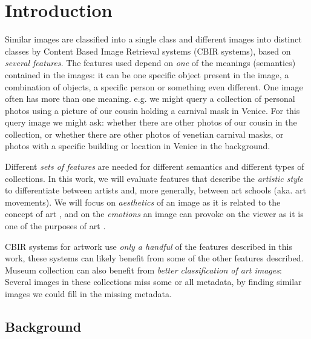 \documentclass[11pt,a4paper,twoside,openright]{report}
\begin{document}
\newpage
\null
\thispagestyle{empty}
\newpage

\newpage
\setcounter{page}{1}

\chapter{Introduction}

Similar images are classified into a single class and different images into
distinct classes by Content Based Image Retrieval systems (CBIR systems), based
on \emph{several features}.  The features used depend on \emph{one} of the
meanings (semantics) contained in the images: it can be one specific object
present in the image, a combination of objects, a specific person or something
even different.  One image often has more than one meaning.  e.g. we might
query a collection of personal photos using a picture of our cousin holding a
carnival mask in Venice.  For this query image we might ask: whether there are
other photos of our cousin in the collection, or whether there are other photos
of venetian carnival masks, or photos with a specific building or location in
Venice in the background.

Different \emph{sets of features} are needed for different semantics and
different types of collections.  In this work, we will evaluate features that
describe the \emph{artistic style} to differentiate between artists and, more
generally, between art schools (aka. art movements).  We will focus on
\emph{aesthetics} of an image as it is related to the concept of art
\cite{rmc12ajs}, and on the \emph{emotions} an image can provoke on the viewer
as it is one of the purposes of art \cite{mach10clas}.

CBIR systems for artwork \cite{cfsp12air,isv12mpeg,ymvz03tree} use \emph{only a
handful} of the features described in this work, these systems can likely
benefit from some of the other features described.  Museum collection can also
benefit from \emph{better classification of art images}:  Several images in
these collections miss some or all metadata, by finding similar images we could
fill in the missing metadata.

\section{Background}
\end{document}
